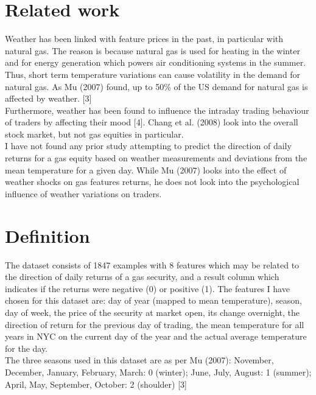 \documentclass[conference,letterpaper]{IEEEtran}
\begin{document}
\section{Related work}
Weather has been linked with feature prices in the past, in particular with natural gas. The reason is because
natural gas is used for heating in the winter and for energy generation which powers air conditioning systems in the summer. 
Thus, short term temperature variations can cause volatility in the demand for natural gas. As Mu (2007) found, up to
50\% of the US demand for natural gas is affected by weather. [3] \\
\indent Furthermore, weather has been found to influence the intraday trading behaviour of traders by affecting their mood [4]. 
Chang et al. (2008) look into the overall stock market, but not gas equities in particular. \\
\indent I have not found any prior study attempting to predict the direction of daily returns for a gas equity based on
weather measurements and deviations from the mean temperature for a given day. While Mu (2007) looks into the effect of
weather shocks on gas features returns, he does not look into the psychological influence of weather variations on traders. \\


\section{Definition}
The dataset consists of 1847 examples with 8 features which may be related to the direction of daily returns of a gas security,
and a result column which indicates if the returns were negative (0) or positive (1). The features I have chosen for this dataset 
are: day of year (mapped to mean temperature), season, day of week, the price of the security at market open, its change overnight, 
the direction of return for the previous day of trading, the mean temperature for all years in NYC on the current day of the year
and the actual average temperature for the day.\\
The three seasons used in this dataset are as per Mu (2007): 
November, December, January, February, March: 0 (winter); 
June, July, August: 1 (summer); 
April, May, September, October: 2 (shoulder) [3] \\
\end{document}
